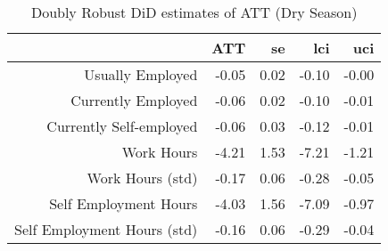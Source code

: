 \begin{table}[ht]
\centering
\begin{tabular}{rrrrr}
  \toprule
 & ATT & se & lci & uci \\ 
  \midrule
Usually Employed & -0.05 & 0.02 & -0.10 & -0.00 \\ 
  Currently Employed & -0.06 & 0.02 & -0.10 & -0.01 \\ 
  Currently Self-employed & -0.06 & 0.03 & -0.12 & -0.01 \\ 
  Work Hours & -4.21 & 1.53 & -7.21 & -1.21 \\ 
  Work Hours (std) & -0.17 & 0.06 & -0.28 & -0.05 \\ 
  Self Employment Hours & -4.03 & 1.56 & -7.09 & -0.97 \\ 
  Self Employment Hours (std) & -0.16 & 0.06 & -0.29 & -0.04 \\ 
   \bottomrule
\end{tabular}
\caption{Doubly Robust DiD estimates of ATT (Dry Season)} 
\end{table}
